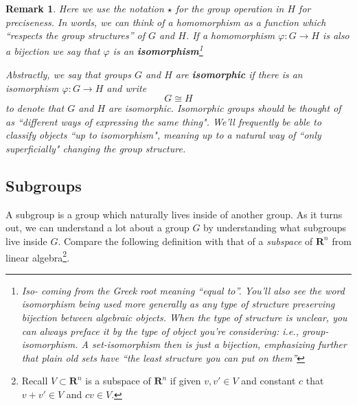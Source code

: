 \documentclass[12pt]{article}
\numberwithin{equation}{subsection}
\theoremstyle{note}
\newtheorem{remark}[subsection]{Remark}
\begin{document}
\begin{remark}Here we use the notation $\star$ for the group operation in $H$ for preciseness. In words, we can think of a homomorphism as a function which ``respects the group structures'' of $G$ and $H$. If a homomorphism $\varphi\colon G\to H$ is also a bijection we say that $\varphi$ is an \textbf{isomorphism}\footnote{\textit{Iso}- coming from the Greek root meaning ``equal to''. You'll also see the word isomorphism being used more generally as any type of structure preserving bijection between algebraic objects. When the type of structure is unclear, you can always preface it by the type of object you're considering: i.e., \textit{group-isomorphism}. A \textit{set-isomorphism} then is just a bijection, emphasizing further that plain old sets have ``the least structure you can put on them''}

Abstractly, we say that groups $G$ and $H$ are \textbf{isomorphic} if there is an isomorphism $\varphi\colon G\to H$ and write \begin{equation} G\cong H \end{equation} to denote that $G$ and $H$ are isomorphic. Isomorphic groups should be thought of as ``different ways of expressing the same thing". We'll frequently be able to classify objects ``up to isomorphism", meaning up to a natural way of ``only superficially" changing the group structure. 
\end{remark}

\subsection{Subgroups}
A subgroup is a group which naturally lives inside of another group. As it turns out, we can understand a lot about a group $G$ by understanding what subgroups live inside $G$. Compare the following definition with that of a \textit{subspace} of $\mathbf{R}^n$ from linear algebra\footnote{Recall $V\subset \mathbf{R}^n$ is a subspace of $\mathbf{R}^n$ if given $v,v'\in V$ and constant $c$ that $v+v'\in V$ and $cv\in V$.}. 
\end{document}
